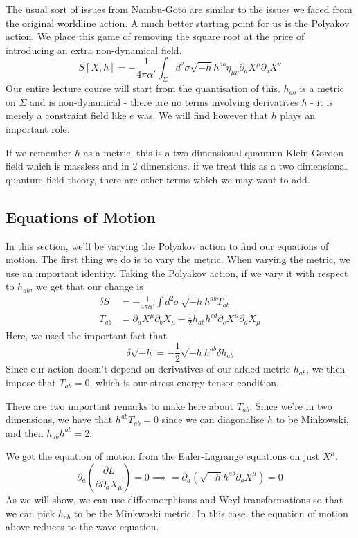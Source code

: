 \documentclass[11pt, oneside]{article}   	%
\theoremstyle{slanted}
\begin{document}
The usual sort of issues from Nambu-Goto 
are similar to the issues we faced from 
the original worldline action. 
A much better starting point 
for us is the Polyakov action. 
We place this game of removing the 
square root at the price of introducing an 
extra non-dynamical field. 
\[
S\left[  X, h   \right] =  - \frac{1}{ 4 \pi \alpha ' } 
\int _{ \Sigma } d ^ 2 \sigma \sqrt{  -h }  h ^{ ab } \eta _{ \mu \nu } 
\partial  _ a X ^ \mu \partial  _ b X ^ \nu 
\]  Our entire lecture course 
will start from the 
quantisation of this. 
$ h _{ ab } $ is a metric on  $ \Sigma $ and is 
non-dynamical  - there are no terms 
involving derivatives $ h$ - it is 
merely a constraint field like $ e $ was. 
We will find however that $ h $ plays 
an important role. 

If we remember $ h $ as a metric, 
this is a two dimensional quantum Klein-Gordon 
field which is massless and in $ 2 $ dimensions. 
if we treat this as a two dimensional quantum field theory, 
there are other terms which we may want to add. 

\subsection{Equations of Motion}
In this section, we'll be varying the 
Polyakov action to find our equations 
of motion. The first thing 
we do is to vary the metric. When varying the metric, 
we use an important identity.
Taking the Polyakov action, if we vary it 
with respect to $ h _{ ab } $, we get that 
our change is 
\begin{align*}
	\delta S &=   - \frac{1}{4 \pi \alpha ' } 
	\int d ^ 2 \sigma \, \sqrt{  -h }  h ^{ ab } T _{ ab }  \\ 
	T_{ ab }  &=  \partial  _ a X ^ \mu \partial  _ b X _ \mu 
	- \frac{1}{2 } h _{ ab } h ^{ cd } \partial  _ c X ^ \mu \partial  
	_ d X _ \mu 
\end{align*}
Here, we used the important 
fact that 
\[
 \delta \sqrt{ - h }  =  - \frac{1}{2 } \sqrt{ - h }  h ^{ ab } \delta h _{ ab  }
\] 
Since our action doesn't depend on 
derivatives of our added metric $ h _{ ab } $, 
we then impose that $ T _{ ab }  = 0 $, 
which is our stress-energy tensor condition. 

There are two important remarks to 
make here about $ T _{ ab } $. Since 
we're in two dimensions, we have that 
$ h ^{ ab } T _{ ab }  =0 $ since we can 
diagonalise $ h $ to be Minkowski, and then $ h _{ ab } h ^{ ab }  =2 $. 

We get the equation of motion 
from the Euler-Lagrange equations on 
just $ X ^ \mu $. 
\[
	\partial  _ a \left( 
	\frac{\partial  L }{\partial  \partial  _ a 
X _ \mu }  \right)    =0 \implies = \partial  _ a 
\left( \sqrt{ - h }  h ^{ ab } \partial  _ b X ^ \mu  \right)   =0 
\] 
As we will show, we can use 
diffeomorphisms and Weyl transformations 
so that we can pick $ h_{ ab } $  to be 
the Minkwoski metric. 
In this case, the equation of motion 
above reduces to the wave equation.
\end{document}
